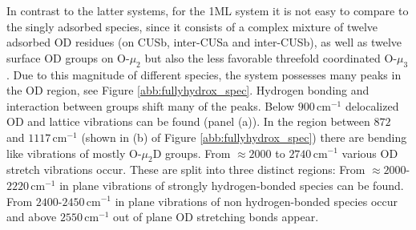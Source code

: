 \documentclass[11pt,DIV=13,BCOR=5mm,a4paper,headinclude]{scrbook}
\begin{document}
In contrast to the latter systems, for the 1ML system it is not easy to compare to the singly adsorbed species, since it consists of a complex mixture of twelve adsorbed OD residues (on CUSb, inter-CUSa and inter-CUSb), as well as twelve surface OD groups on O-$\mu_2$ but also the less favorable threefold coordinated O-$\mu_3$.
Due to this magnitude of different species, the system possesses many peaks in the OD region, see Figure \ref{abb:fullyhydrox_spec}.
Hydrogen bonding and interaction between groups shift many of the peaks.
Below $900\,$cm$^{-1}$ delocalized OD and lattice vibrations can be found (panel (a)).
In the region between $872$ and $1117\,$cm$^{-1}$ (shown in (b) of Figure \ref{abb:fullyhydrox_spec}) there are bending like vibrations of mostly O-$\mu_2$D groups.
From $\approx2000$ to $2740\,$cm$^{-1}$ various OD stretch vibrations occur.
These are split into three distinct regions: From $\approx 2000$-$2220\,$cm$^{-1}$ in plane vibrations of strongly hydrogen-bonded species can be found.
From $2400$-$2450\,$cm$^{-1}$ in plane vibrations of non hydrogen-bonded species occur and above $2550\,$cm$^{-1}$ out of plane OD stretching bonds appear.
\end{document}
